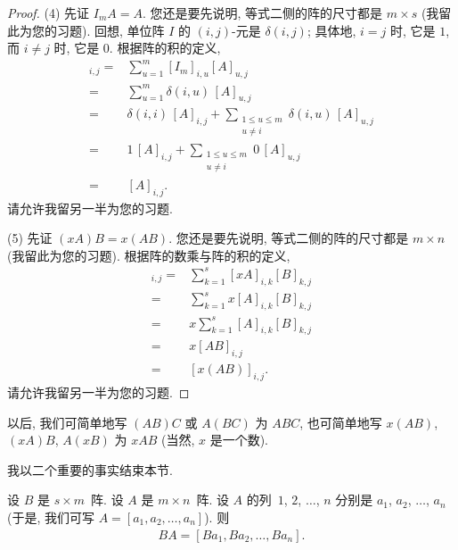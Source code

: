 \begin{proof}
    (4)
    先证 \(I_m A = A\).
    您还是要先说明, 等式二侧的阵的尺寸都是 \(m \times s\)
    (我留此为您的习题).
    回想, 单位阵 \(I\) 的 \((i, j)\)-元是
    \(\delta(i, j)\);
    具体地, \(i = j\) 时, 它是 \(1\),
    而 \(i \neq j\) 时, 它是 \(0\).
    根据阵的积的定义,
    \begin{align*}
        [I_m A]_{i,j}
        = {} &
        \sum_{u = 1}^{m} {[I_m]_{i,u} [A]_{u,j}}
        \\
        = {} &
        \sum_{u = 1}^{m} {\delta(i, u)\, [A]_{u,j}}
        \\
        = {} &
        \delta(i, i)\, [A]_{i,j}
        + \sum_{\substack{1 \leq u \leq m \\ u \neq i}}
        {\delta(i, u)\, [A]_{u,j}}
        \\
        = {} &
        1\,[A]_{i,j}
        + \sum_{\substack{1 \leq u \leq m \\ u \neq i}}
        {0\,[A]_{u,j}}
        \\
        = {} & [A]_{i,j}.
    \end{align*}
    请允许我留另一半为您的习题.

    (5)
    先证 \((xA)B = x(AB)\).
    您还是要先说明, 等式二侧的阵的尺寸都是 \(m \times n\)
    (我留此为您的习题).
    根据阵的数乘与阵的积的定义,
    \begin{align*}
        [(xA)B]_{i,j}
        = {} &
        \sum_{k = 1}^{s} {[xA]_{i,k} [B]_{k,j}}
        \\
        = {} &
        \sum_{k = 1}^{s} {x[A]_{i,k} [B]_{k,j}}
        \\
        = {} &
        x \sum_{k = 1}^{s} {[A]_{i,k} [B]_{k,j}}
        \\
        = {} &
        x [AB]_{i,j}
        \\
        = {} &
        [x(AB)]_{i,j}.
    \end{align*}
    请允许我留另一半为您的习题.
\end{proof}

以后, 我们可简单地写 \((AB)C\) 或 \(A(BC)\) 为 \(ABC\),
也可简单地写 \(x(AB)\), \((xA)B\), \(A(xB)\)
为 \(xAB\)
(当然, \(x\) 是一个数).

\vspace{2ex}

我以二个重要的事实结束本节.

\begin{theorem}
    设 \(B\) 是 \(s \times m\)~阵.
    设 \(A\) 是 \(m \times n\)~阵.
    设 \(A\) 的列~\(1\), \(2\), \(\dots\), \(n\)
    分别是 \(a_1\), \(a_2\), \(\dots\), \(a_n\)
    (于是, 我们可写 \(A = [a_1, a_2, \dots, a_n]\)).
    则
    \begin{align*}
        BA = [Ba_1, Ba_2, \dots, Ba_n].
    \end{align*}
\end{theorem}

